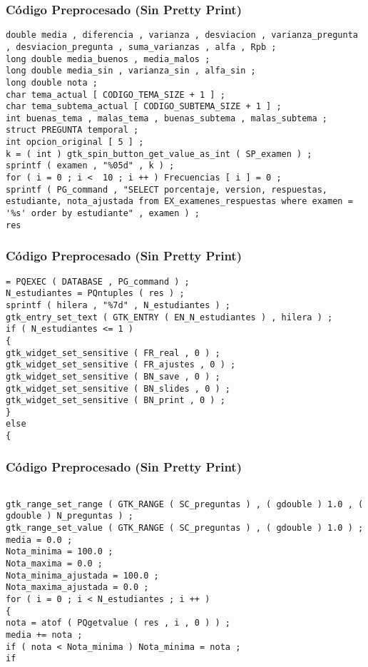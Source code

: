 \documentclass{beamer}
\begin{document}
\begin{frame}[fragile]
\frametitle{C\'odigo Preprocesado (Sin Pretty Print)}
\begin{lstlisting}[style=CStyle]
double media , diferencia , varianza , desviacion , varianza_pregunta , desviacion_pregunta , suma_varianzas , alfa , Rpb ; 
long double media_buenos , media_malos ; 
long double media_sin , varianza_sin , alfa_sin ; 
long double nota ; 
char tema_actual [ CODIGO_TEMA_SIZE + 1 ] ; 
char tema_subtema_actual [ CODIGO_SUBTEMA_SIZE + 1 ] ; 
int buenas_tema , malas_tema , buenas_subtema , malas_subtema ; 
struct PREGUNTA temporal ; 
int opcion_original [ 5 ] ; 
k = ( int ) gtk_spin_button_get_value_as_int ( SP_examen ) ; 
sprintf ( examen , "%05d" , k ) ; 
for ( i = 0 ; i <  10 ; i ++ ) Frecuencias [ i ] = 0 ; 
sprintf ( PG_command , "SELECT porcentaje, version, respuestas, estudiante, nota_ajustada from EX_examenes_respuestas where examen = '%s' order by estudiante" , examen ) ; 
res \end{lstlisting}
\end{frame}
\begin{frame}[fragile]
\frametitle{C\'odigo Preprocesado (Sin Pretty Print)}
\begin{lstlisting}[style=CStyle]
= PQEXEC ( DATABASE , PG_command ) ; 
N_estudiantes = PQntuples ( res ) ; 
sprintf ( hilera , "%7d" , N_estudiantes ) ; 
gtk_entry_set_text ( GTK_ENTRY ( EN_N_estudiantes ) , hilera ) ; 
if ( N_estudiantes <= 1 ) 
{ 
gtk_widget_set_sensitive ( FR_real , 0 ) ; 
gtk_widget_set_sensitive ( FR_ajustes , 0 ) ; 
gtk_widget_set_sensitive ( BN_save , 0 ) ; 
gtk_widget_set_sensitive ( BN_slides , 0 ) ; 
gtk_widget_set_sensitive ( BN_print , 0 ) ; 
} 
else 
{ \end{lstlisting}
\end{frame}
\begin{frame}[fragile]
\frametitle{C\'odigo Preprocesado (Sin Pretty Print)}
\begin{lstlisting}[style=CStyle]

gtk_range_set_range ( GTK_RANGE ( SC_preguntas ) , ( gdouble ) 1.0 , ( gdouble ) N_preguntas ) ; 
gtk_range_set_value ( GTK_RANGE ( SC_preguntas ) , ( gdouble ) 1.0 ) ; 
media = 0.0 ; 
Nota_minima = 100.0 ; 
Nota_maxima = 0.0 ; 
Nota_minima_ajustada = 100.0 ; 
Nota_maxima_ajustada = 0.0 ; 
for ( i = 0 ; i < N_estudiantes ; i ++ ) 
{ 
nota = atof ( PQgetvalue ( res , i , 0 ) ) ; 
media += nota ; 
if ( nota < Nota_minima ) Nota_minima = nota ; 
if \end{lstlisting}
\end{frame}
\end{document}
